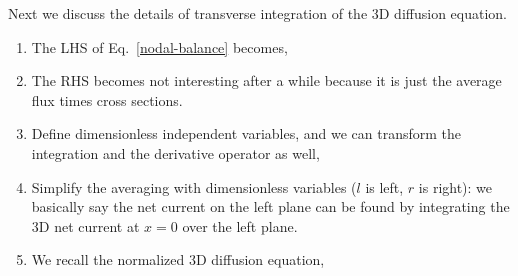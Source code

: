 \documentclass{school-22.211-notes}
\begin{document}
Next we discuss the details of transverse integration of the 3D diffusion equation. 
\begin{enumerate}
\item The LHS of Eq.~\ref{nodal-balance} becomes, 

\item The RHS becomes not interesting after a while because it is just the average flux times cross sections. 

\item Define dimensionless independent variables,
  and we can transform the integration and the derivative operator as well, 

\item Simplify the averaging with dimensionless variables ($l$ is left, $r$ is right): we basically say the net current on the left plane can be found by integrating the 3D net current at $x=0$ over the left plane. 

\item We recall the normalized 3D diffusion equation, 


\end{enumerate}
\end{document}
